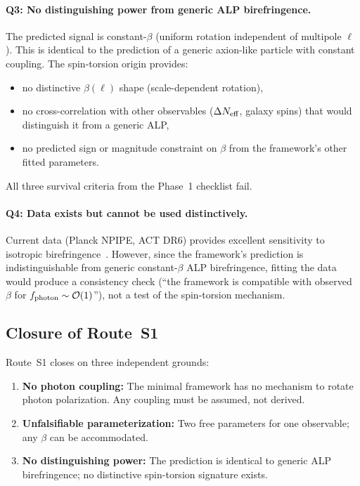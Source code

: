 \documentclass[11pt,letterpaper]{article}
\newcommand{\Neff}{\Delta N_{\rm eff}}
\begin{document}
\paragraph{Q3: No distinguishing power from generic ALP birefringence.}
The predicted signal is constant-$\beta$ (uniform rotation independent of
multipole $\ell$). This is identical to the prediction of a generic
axion-like particle with constant coupling. The spin-torsion origin
provides:
\begin{itemize}
  \item no distinctive $\beta(\ell)$ shape (scale-dependent rotation),
  \item no cross-correlation with other observables ($\Neff$, galaxy
    spins) that would distinguish it from a generic ALP,
  \item no predicted sign or magnitude constraint on $\beta$ from the
    framework's other fitted parameters.
\end{itemize}
All three survival criteria from the Phase~1 checklist fail.

\paragraph{Q4: Data exists but cannot be used distinctively.}
Current data (Planck NPIPE, ACT DR6) provides excellent sensitivity to
isotropic birefringence~\cite{DiegoPalazuelos2025,EskiltKomatsu2022}.
However, since the framework's prediction is indistinguishable from
generic constant-$\beta$ ALP birefringence, fitting the data would
produce a consistency check (``the framework is compatible with observed
$\beta$ for $f_{\rm photon}\sim\mathcal{O}(1)$''), not a test of the
spin-torsion mechanism.

\subsection{Closure of Route~S1}\label{sec:S1_closure}

Route~S1 closes on three independent grounds:
\begin{enumerate}
  \item \textbf{No photon coupling:} The minimal framework has no
    mechanism to rotate photon polarization. Any coupling must be
    assumed, not derived.
  \item \textbf{Unfalsifiable parameterization:} Two free parameters for
    one observable; any $\beta$ can be accommodated.
  \item \textbf{No distinguishing power:} The prediction is identical to
    generic ALP birefringence; no distinctive spin-torsion signature
    exists.
\end{enumerate}
\end{document}
